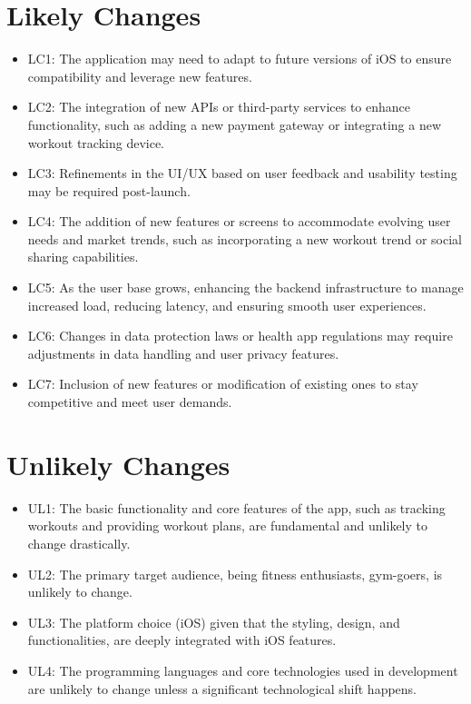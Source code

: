 \documentclass[12pt]{article}
\begin{document}
\section{Likely Changes}
\begin{itemize}
    \item LC1: The application may need to adapt to future versions of iOS to ensure compatibility and leverage new features.
    \item LC2: The integration of new APIs or third-party services to enhance functionality, such as adding a new payment gateway or integrating a new workout tracking device.
    \item LC3: Refinements in the UI/UX based on user feedback and usability testing may be required post-launch.
    \item LC4: The addition of new features or screens to accommodate evolving user needs and market trends, such as incorporating a new workout trend or social sharing capabilities.
    \item LC5: As the user base grows, enhancing the backend infrastructure to manage increased load, reducing latency, and ensuring smooth user experiences.
    \item LC6: Changes in data protection laws or health app regulations may require adjustments in data handling and user privacy features.
    \item LC7: Inclusion of new features or modification of existing ones to stay competitive and meet user demands.
\end{itemize}

\section{Unlikely Changes}
\begin{itemize}
    \item UL1: The basic functionality and core features of the app, such as tracking workouts and providing workout plans, are fundamental and unlikely to change drastically.
    \item UL2: The primary target audience, being fitness enthusiasts, gym-goers, is unlikely to change.
    \item UL3: The platform choice (iOS) given that the styling, design, and functionalities, are deeply integrated with iOS features.
    \item UL4: The programming languages and core technologies used in development are unlikely to change unless a significant technological shift happens.
\end{itemize}
\end{document}
